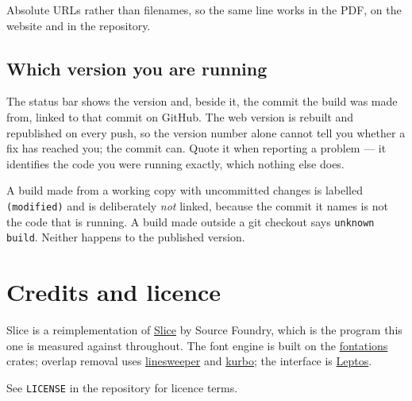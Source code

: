 \documentclass[11pt,a4paper]{article}
\begin{document}
Absolute URLs rather than filenames, so the same line works in the PDF, on the website and in the repository.

\subsection{Which version you are running}

The status bar shows the version and, beside it, the commit the build was made from, linked to that commit on GitHub. The web version is rebuilt and republished on every push, so the version number alone cannot tell you whether a fix has reached you; the commit can. Quote it when reporting a problem --- it identifies the code you were running exactly, which nothing else does.

A build made from a working copy with uncommitted changes is labelled \texttt{(modified)} and is deliberately \emph{not} linked, because the commit it names is not the code that is running. A build made outside a git checkout says \texttt{unknown build}. Neither happens to the published version.

\section{Credits and licence}

Slice is a reimplementation of \href{https://github.com/source-foundry/Slice}{Slice} by Source Foundry, which is the program this one is measured against throughout. The font engine is built on the \href{https://github.com/googlefonts/fontations}{fontations} crates; overlap removal uses \href{https://crates.io/crates/linesweeper}{linesweeper} and \href{https://github.com/linebender/kurbo}{kurbo}; the interface is \href{https://leptos.dev}{Leptos}.

See \texttt{LICENSE} in the repository for licence terms.
\end{document}
